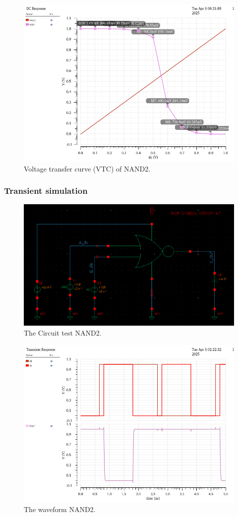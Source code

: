 \begin{figure}[H]
	\centering
	\includegraphics[width=.6\linewidth]{section/EX1/NAND/EX1_NAND2_DCanalysis_vtc.png}
	\caption{Voltage transfer curve (VTC) of NAND2.}
	\label{f_EX1_NAND2_DCanalysis_vtc}
\end{figure}

\subsubsection{Transient simulation}

\begin{figure}[H]
	\centering
	\includegraphics[width=.6\linewidth]{section/EX1/NAND/EX1_NAND2_Trans_schematic.png}
	\caption{The Circuit test NAND2.}
\end{figure}

\begin{figure}[H]
	\centering
	\includegraphics[width=.6\linewidth]{section/EX1/NAND/EX1_NAND2_waveform.png}
	\caption{The waveform NAND2.}
	\label{f_EX1_NAND2_waveform}
\end{figure}

